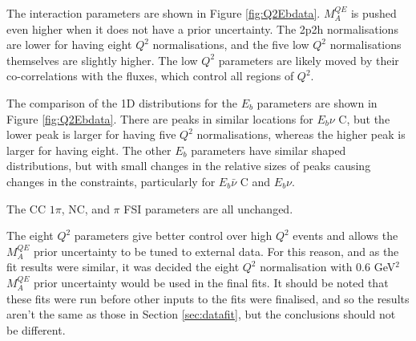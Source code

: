 The interaction parameters are shown in Figure \ref{fig:Q2Ebdata}. $M_{A}^{QE}$ is pushed even higher when it does not have a prior uncertainty. The 2p2h normalisations are lower for having eight $Q^2$ normalisations, and the five low $Q^2$ normalisations themselves are slightly higher. The low $Q^2$ parameters are likely moved by their co-correlations with the fluxes, which control all regions of $Q^2$.

The comparison of the 1D distributions for the $E_b$ parameters are shown in Figure \ref{fig:Q2Ebdata}. There are peaks in similar locations for $E_b \nu$ C, but the lower peak is larger for having five $Q^2$ normalisations, whereas the higher peak is larger for having eight. The other $E_b$ parameters have similar shaped distributions, but with small changes in the relative sizes of peaks causing changes in the constraints, particularly for $E_b \bar{\nu}$ C and $E_b \nu$.

The CC $1\pi$, NC, and $\pi$ FSI parameters are all unchanged.

The eight $Q^2$ parameters give better control over high $Q^2$ events and allows the $M_{A}^{QE}$ prior uncertainty to be tuned to external data. For this reason, and as the fit results were similar, it was decided the eight $Q^2$ normalisation with 0.6 GeV$^2$ $M_{A}^{QE}$ prior uncertainty would be used in the final fits. It should be noted that these fits were run before other inputs to the fits were finalised, and so the results aren't the same as those in Section \ref{sec:datafit}, but the conclusions should not be different.


